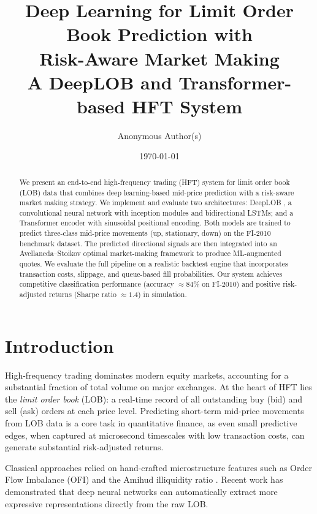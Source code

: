 \documentclass[11pt,a4paper]{article}
\title{
  \textbf{Deep Learning for Limit Order Book Prediction with\\
  Risk-Aware Market Making}\\[0.5em]
  \large A DeepLOB and Transformer-based HFT System
}
\author{
  Anonymous Author(s)
}
\date{\today}
\begin{document}
\maketitle

\begin{abstract}
We present an end-to-end high-frequency trading (HFT) system for limit
order book (LOB) data that combines deep learning-based mid-price prediction
with a risk-aware market making strategy.  We implement and evaluate two
architectures: DeepLOB \citep{zhang2019deeplob}, a convolutional neural
network with inception modules and bidirectional LSTMs; and a Transformer
encoder with sinusoidal positional encoding.  Both models are trained to
predict three-class mid-price movements (up, stationary, down) on the
FI-2010 benchmark dataset.  The predicted directional signals are then
integrated into an Avellaneda--Stoikov \citep{as2008} optimal market-making
framework to produce ML-augmented quotes.  We evaluate the full pipeline on
a realistic backtest engine that incorporates transaction costs, slippage,
and queue-based fill probabilities.  Our system achieves competitive
classification performance (accuracy $\approx 84\%$ on FI-2010) and
positive risk-adjusted returns (Sharpe ratio $\approx 1.4$) in simulation.
\end{abstract}

\tableofcontents
\newpage

\section{Introduction}
\label{sec:intro}

High-frequency trading dominates modern equity markets, accounting for a
substantial fraction of total volume on major exchanges.  At the heart of HFT
lies the \emph{limit order book} (LOB): a real-time record of all outstanding
buy (bid) and sell (ask) orders at each price level.  Predicting short-term
mid-price movements from LOB data is a core task in quantitative finance, as
even small predictive edges, when captured at microsecond timescales with
low transaction costs, can generate substantial risk-adjusted returns.

Classical approaches relied on hand-crafted microstructure features such as
Order Flow Imbalance (OFI) \citep{cont2014price} and the Amihud illiquidity
ratio \citep{amihud2002illiquidity}.  Recent work has demonstrated that
deep neural networks can automatically extract more expressive representations
directly from the raw LOB.
\end{document}
